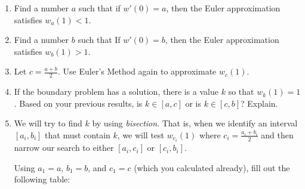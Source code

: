 \begin{enumerate}
	      \begin{enumerate}
		      \item Find a number $a$ such that if $w'(0)=a$, then the Euler approximation satisfies $w_{a}(1)<1$.

		      \item Find a number $b$ such that If $w'(0)=b$, then the Euler approximation satisfies $w_{b}(1)>1$.

		      \item Let $c = \frac{a+b}{2}$. Use Euler's Method again to approximate $w_c(1)$.

			  \item If the boundary problem has a solution, there is a value $k$ so that $w_k(1)=1$.
			  Based on your previous results, is $k\in [a,c]$ or is $k\in [c,b]$? Explain.

		      \item We will try to find $k$ by using \emph{bisection}. That is, when we identify an interval
			  $[a_i, b_i]$ that must contain $k$, we will test $w_{c_i}(1)$ where $c_i=\frac{a_i+b_i}{2}$ and then
			  narrow our search to either $[a_i, c_i]$ or $[c_i,b_i]$.

		      Using $a_1=a$, $b_1=b$, and $c_1=c$ (which you calculated already), fill out the following table:


\end{enumerate}
\end{enumerate}
